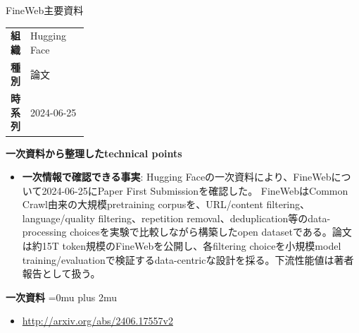 \Needspace{0.38\textheight}
\begin{technicalnote}{FineWeb}{主要資料}
\begingroup
\begin{tabularx}{\linewidth}{@{}>{\bfseries}p{0.22\linewidth}X@{}}
組織 & Hugging Face \\
種別 & 論文 \\
時系列 & 2024-06-25 \\
\end{tabularx}
\smallskip
\begin{minipage}{\linewidth}
{\bfseries 一次資料から整理したtechnical points}
\begin{itemize}[leftmargin=1.5em,itemsep=0.35em]
\item \textbf{一次情報で確認できる事実}: Hugging Faceの一次資料により、FineWebについて2024-06-25にPaper First Submissionを確認した。 FineWebはCommon Crawl由来の大規模pretraining corpusを、URL/content filtering、language/quality filtering、repetition removal、deduplication等のdata-processing choicesを実験で比較しながら構築したopen datasetである。論文は約15T token規模のFineWebを公開し、各filtering choiceを小規模model training/evaluationで検証するdata-centricな設計を採る。下流性能値は著者報告として扱う。
\end{itemize}
\begin{minipage}{\linewidth}
\begin{samepage}
{\bfseries 一次資料}
\begingroup\sloppy
\Urlmuskip=0mu plus 2mu\relax
\begin{itemize}[leftmargin=1.5em,itemsep=0.25em]
\item {\scriptsize\url{http://arxiv.org/abs/2406.17557v2}}
\end{itemize}
\endgroup
\end{samepage}
\end{minipage}
\end{minipage}
\endgroup
\end{technicalnote}
\medskip

